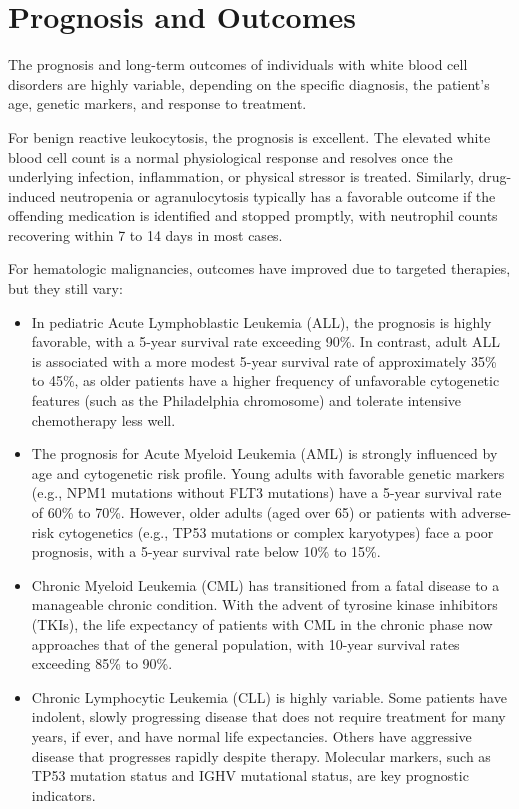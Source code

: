 \section*{Prognosis and Outcomes}
The prognosis and long-term outcomes of individuals with white blood cell disorders are highly variable, depending on the specific diagnosis, the patient's age, genetic markers, and response to treatment.

For benign reactive leukocytosis, the prognosis is excellent. The elevated white blood cell count is a normal physiological response and resolves once the underlying infection, inflammation, or physical stressor is treated. Similarly, drug-induced neutropenia or agranulocytosis typically has a favorable outcome if the offending medication is identified and stopped promptly, with neutrophil counts recovering within 7 to 14 days in most cases.

For hematologic malignancies, outcomes have improved due to targeted therapies, but they still vary:
\begin{itemize}
  \item In pediatric Acute Lymphoblastic Leukemia (ALL), the prognosis is highly favorable, with a 5-year survival rate exceeding 90\%. In contrast, adult ALL is associated with a more modest 5-year survival rate of approximately 35\% to 45\%, as older patients have a higher frequency of unfavorable cytogenetic features (such as the Philadelphia chromosome) and tolerate intensive chemotherapy less well.
  \item The prognosis for Acute Myeloid Leukemia (AML) is strongly influenced by age and cytogenetic risk profile. Young adults with favorable genetic markers (e.g., NPM1 mutations without FLT3 mutations) have a 5-year survival rate of 60\% to 70\%. However, older adults (aged over 65) or patients with adverse-risk cytogenetics (e.g., TP53 mutations or complex karyotypes) face a poor prognosis, with a 5-year survival rate below 10\% to 15\%.
  \item Chronic Myeloid Leukemia (CML) has transitioned from a fatal disease to a manageable chronic condition. With the advent of tyrosine kinase inhibitors (TKIs), the life expectancy of patients with CML in the chronic phase now approaches that of the general population, with 10-year survival rates exceeding 85\% to 90\%.
  \item Chronic Lymphocytic Leukemia (CLL) is highly variable. Some patients have indolent, slowly progressing disease that does not require treatment for many years, if ever, and have normal life expectancies. Others have aggressive disease that progresses rapidly despite therapy. Molecular markers, such as TP53 mutation status and IGHV mutational status, are key prognostic indicators.
\end{itemize}

